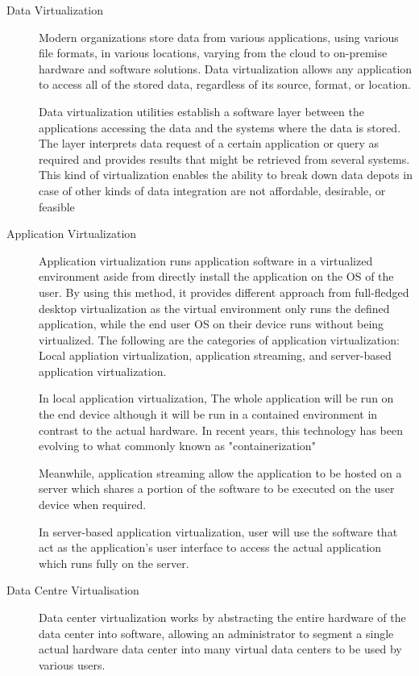 \documentclass[../index.tex]{subfiles}
\begin{document}
\begin{description}
  \item[Data Virtualization] Modern organizations store data from various applications, using
    various file formats, in various locations, varying from the cloud to on-premise hardware and
    software solutions. Data virtualization allows any application to access all of the stored data,
    regardless of its source, format, or location.

    Data virtualization utilities establish a software layer between the applications accessing the
    data and the systems where the data is stored. The layer interprets data request of a certain
    application or query as required and provides results that might be retrieved from several
    systems. This kind of virtualization enables the ability to break down data depots in case of
    other kinds of data integration are not affordable, desirable, or feasible

  \item[Application Virtualization] Application virtualization runs application software in a
    virtualized environment aside from directly install the application on the OS of the user. By
    using this method, it provides different approach from full-fledged desktop virtualization as
    the virtual environment only runs the defined application, while the end user OS on their device
    runs without being virtualized. The following are the categories of application virtualization:
    Local appliation virtualization, application streaming, and server-based application
    virtualization.

    In local application virtualization, The whole application will be run on the end device
    although it will be run in a contained environment in contrast to the actual hardware. In recent
    years, this technology has been evolving to what commonly known as "containerization"

    Meanwhile, application streaming allow the application to be hosted on a server which shares a
    portion of the software to be executed on the user device when required.

    In server-based application virtualization, user will use the software that act as the
    application’s user interface to access the actual application which runs fully on the server.

  \item[Data Centre Virtualisation] Data center virtualization works by abstracting the entire
    hardware of the data center into software, allowing an administrator to segment a single actual
    hardware data center into many virtual data centers to be used by various users.


\end{description}
\end{document}
